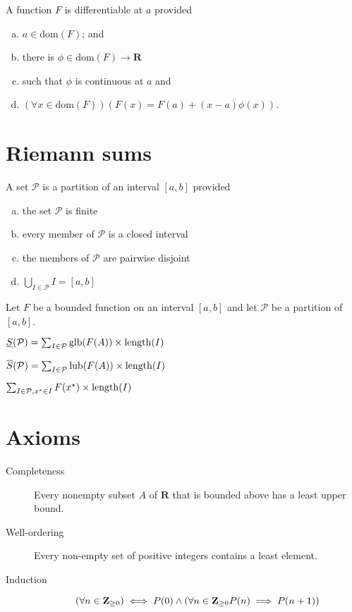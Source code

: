 \documentclass[letterpaper,landscape,9pt,fleqn]{extarticle}
\newcommand{\dom}{\mathrm{dom}}
\newcommand{\reals}{\mathbf{R}}
\newcommand{\integers}{\mathbf{Z}}
\newcommand{\glb}{\mathrm{glb}}
\newcommand{\lub}{\mathrm{lub}}
\newcommand{\length}{\mathrm{length}}
\DeclarePairedDelimiter{\parens}{\lparen}{\rparen}
\newenvironment{alphalist}{
  \begin{enumerate}[(a)]
    \addtolength{\itemsep}{-1.0\itemsep}}
  {\end{enumerate}}
\begin{document}
\begin{multicols*}{3}
\begin{description}[\itemsep=0em]
    \item[Differentiable] A function $F$ is differentiable at $a$ provided
     \begin{alphalist}
    \item $a \in \dom(F)$; and
       \item there is $\phi \in \dom(F) \to \reals$
       \item such that $\phi$ is continuous at $a$ and
       \item $(\forall x \in \dom(F))(F(x) = F(a) + (x-a) \phi(x))$.
     \end{alphalist}
\end{description}

\section*{Riemann sums}
\begin{description}[\itemsep=0em]
    \item[Partition] A set $\mathcal{P}$ is a partition of an 
    interval $[a,b]$ provided
    \begin{alphalist}
        \item the set  $\mathcal{P}$ is finite
        \item every member of $\mathcal{P}$ is a closed interval
        \item the members of $\mathcal{P}$ are pairwise disjoint
        \item $\underset{I \in \mathcal{P}} \bigcup I = [a,b]$
    \end{alphalist}
\end{description}
Let $F$ be a bounded function on an interval $[a,b]$ and let
$\mathcal{P}$ be a partition of $[a,b]$. 
\begin{description}[\itemsep=0em]    
    \item[Lower sum] $\underline{S}(\mathcal{P}) = \sum_{I \in \mathcal{P}} \glb \parens*{F \parens*{A}} \times  \length(I)$
    \item[Upper sum] $\overline{S}(\mathcal{P}) = \sum_{I \in \mathcal{P}} \lub \parens*{F \parens*{A}} \times  \length(I)$
    \item[Riemann sum] $\sum_{I \in \mathcal{P}, x^\star \in I} F \parens*{x^\star} \times  \length(I)$
\end{description}

\section*{Axioms}
\begin{description}
    \item[Completeness] Every nonempty subset $A$ of $\reals$ that is 
    bounded above has a least upper bound.
    \item[Well-ordering]  Every non-empty set of positive integers 
        contains a least element.
    \item[Induction] $$ \parens*{\forall n \in \integers_{\geq 0}} 
    \iff P(0) \land \parens*{\forall n \in 
    \integers_{\geq 0}  P(n) \implies P(n+1)}$$
\end{description}


\end{multicols*}
\end{document}
